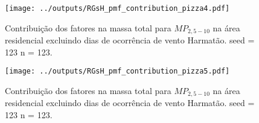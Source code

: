 \begin{landscape}
  \begin{figure}
    \centering
    \begin{minipage}[b]{0.45\linewidth}
      \texttt{[image: ../outputs/RGsH\_pmf\_contribution\_pizza4.pdf]}
      \caption{Contribuição dos fatores na massa total para $MP_{2,5-10}$ na área
               residencial excluindo dias de ocorrência de vento Harmatão. seed = 123 n = 123.
               \label{fig:RGsH_contribution4}}
    \end{minipage}%
    \hspace{0.5cm}
    \begin{minipage}[b]{0.45\linewidth}
      
    \end{minipage}
  \end{figure}
\end{landscape}

\begin{landscape}
  \begin{figure}
    \centering
    \begin{minipage}[b]{0.45\linewidth}
      \texttt{[image: ../outputs/RGsH\_pmf\_contribution\_pizza5.pdf]}
      \caption{Contribuição dos fatores na massa total para $MP_{2,5-10}$ na área
               residencial excluindo dias de ocorrência de vento Harmatão. seed = 123 n = 123.
               \label{fig:RGsH_contribution5}}
    \end{minipage}%
    \hspace{0.5cm}
    \begin{minipage}[b]{0.45\linewidth}
      
    \end{minipage}
  \end{figure}
\end{landscape}



